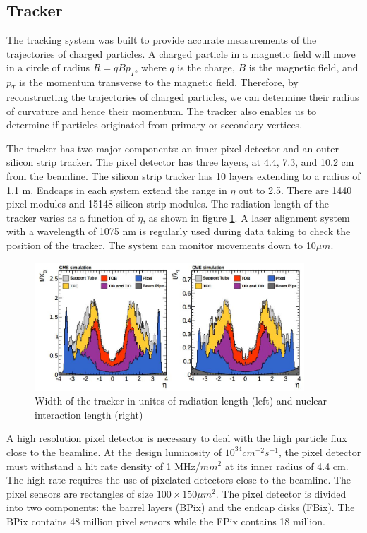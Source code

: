 \documentclass[oneside, letterpaper, oldfontcommands]{memoir}
\begin{document}
\subsection{Tracker}\label{tracker}

\qquad The tracking system was built to provide accurate measurements of the trajectories of charged particles.  A charged particle in a magnetic field will move in a circle of radius $R = qBp_{T}$, where $q$ is the charge, $B$ is the magnetic field, and $p_{T}$ is the momentum transverse to the magnetic field. Therefore, by reconstructing the trajectories of charged particles, we can determine their radius of curvature and hence their momentum. The tracker also enables us to determine if particles originated from primary or secondary vertices.

\qquad The tracker has two major components: an inner pixel detector and an outer silicon strip tracker. The pixel detector has three layers, at 4.4, 7.3, and 10.2 cm from the beamline. The silicon strip tracker has 10 layers extending to a radius of 1.1 m. Endcaps in each system extend the range in $\eta$ out to 2.5. There are 1440 pixel modules and 15148 silicon strip modules. The radiation length of the tracker varies as a function of $\eta$, as shown in figure \ref{fig:trackerlength}. A laser alignment system with a wavelength of 1075 nm is regularly used during data taking to check the position of the tracker. The system can monitor movements down to 10$\mu m$. 

\begin{figure}[here]
\includegraphics[width=0.9\textwidth]{trackerlength.jpg}
\caption{Width of the tracker in unites of radiation length (left) and nuclear interaction length (right) \cite{Chatrchyan:2014fea}}
\label{fig:trackerlength}
\end{figure}


\qquad A high resolution pixel detector is necessary to deal with the high particle flux close to the beamline.  At the design luminosity of $10^{34} cm^{-2} s^{-1}$, the pixel detector must withstand a hit rate density of 1 MHz/$mm^{2}$ at its inner radius of 4.4 cm. The high rate requires the use of pixelated detectors close to the beamline. The pixel sensors are rectangles of size $100 \times 150 \mu m^{2}$. The pixel detector is divided into two components: the barrel layers (BPix) and the endcap disks (FBix). The BPix contains 48 million pixel sensors while the FPix contains 18 million.
\end{document}
